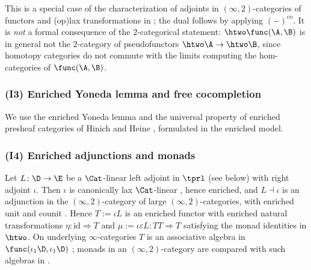 This is a special case of the characterization of adjoints in $(\infty,2)$-categories of functors and (op)lax transformations in \cite{abellangagnahaugseng2024straightening}; the dual follows by applying $(-)^{\mathrm{co}}$.
It is \emph{not} a formal consequence of the $2$-categorical statement: $\htwo\func(\A,\B)$ is in general not the $2$-category of pseudofunctors $\htwo\A \to \htwo\B$, since homotopy categories do not commute with the limits computing the hom-categories of $\func(\A,\B)$.

\subsubsection*{(I3) Enriched Yoneda lemma and free cocompletion}
We use the enriched Yoneda lemma and the universal property of enriched presheaf categories of Hinich \cite{hinich2020yoneda} and Heine \cite{heine2023enriched}, formulated in the enriched model.

\subsubsection*{(I4) Enriched adjunctions and monads}
Let $L\colon \D \to \E$ be a $\Cat$-linear left adjoint in $\tprl$ (see below) with right adjoint $\iota$. Then $\iota$ is canonically lax $\Cat$-linear \cite[7.3.2.7]{ha}, hence enriched, and $L \dashv \iota$ is an adjunction in the $(\infty,2)$-category of large $(\infty,2)$-categories, with enriched unit and counit \cite{heine2023enriched}.
Hence $T := \iota L$ is an enriched functor with enriched natural transformations $\eta\colon \mathrm{id} \Rightarrow T$ and $\mu := \iota\varepsilon L\colon TT \Rightarrow T$ satisfying the monad identities in $\htwo$. On underlying $\infty$-categories $T$ is an associative algebra in $\func(\iota_{1}\D,\iota_{1}\D)$ \cite[\S 4.7.3]{ha}; monads in an $(\infty,2)$-category are compared with such algebras in \cite{haugseng2021laxmonads}.

